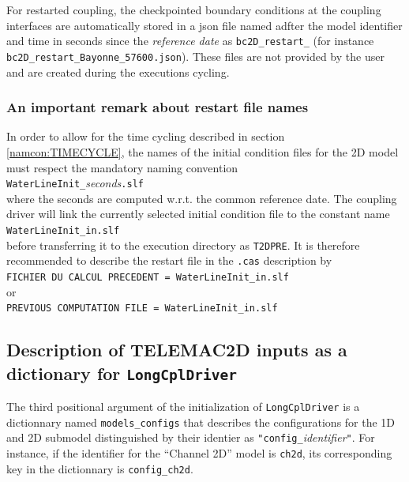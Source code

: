 \documentclass[Coupling]{../../data/TelemacDoc} %
\begin{document}
For restarted coupling, the checkpointed boundary conditions at the
coupling interfaces are automatically stored in a json file named adfter the model 
identifier and time in seconds since the {\em reference
  date} as \texttt{bc2D\_restart\_} (for instance \texttt{bc2D\_restart\_Bayonne\_57600.json}). These files are not provided by the user and are created during the executions cycling.

\subsubsection{An important remark about restart file names}
In order to allow for the time cycling described in section
\ref{namcon:TIMECYCLE}, the names of the initial condition files for
the 2D model must respect the mandatory naming convention\\
\texttt{WaterLineInit\_}{\em seconds}\texttt{.slf}\\
where the seconds are computed w.r.t. the common reference date. 
The coupling driver will link the currently selected initial condition
file to the constant name\\
\texttt{WaterLineInit\_in.slf}\\
before transferring it to the execution directory as
\texttt{T2DPRE}. It is therefore recommended to describe the restart
file in the \texttt{.cas} description by\\
\texttt{FICHIER DU CALCUL PRECEDENT = WaterLineInit\_in.slf}\\
or\\
\texttt{PREVIOUS COMPUTATION FILE = WaterLineInit\_in.slf}

\subsection{Description of TELEMAC2D inputs as a dictionary for \texttt{LongCplDriver}}
The third positional argument of the initialization of
\texttt{LongCplDriver} is a dictionnary named \texttt{models\_configs} that describes the configurations for the 1D and 2D submodel distinguished by their identier as \texttt{"config\_}{\em identifier}\texttt{"}. For instance, if the identifier for the ``Channel 2D'' model is
\texttt{ch2d}, its corresponding key in the dictionnary is \texttt{config\_ch2d}.
\newline
\end{document}
